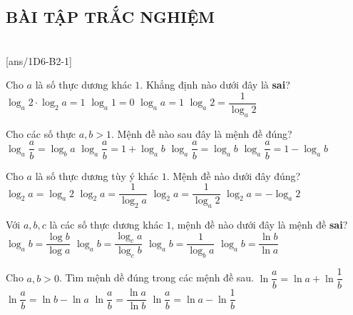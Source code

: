 \subsection{BÀI TẬP TRẮC NGHIỆM}

 \\
\setcounter{ex}{0}
[ans/1D6-B2-1]
\begin{ex}
	Cho $a$ là số thực dương khác $1$. Khẳng định nào dưới đây là \textbf{sai}?
	\choice
	{ $\log_a {2}\cdot \log_2 {a}=1$}
	{$\log_a {1}=0$}
	{$\log_a {a}=1$}
	{\True $\log_a {2}=\dfrac{1}{\log_a {2}}$}
	
	
\end{ex} 

\begin{ex}
	Cho các số thực $a, b>1$. Mệnh đề nào sau đây là mệnh đề đúng?
	\choice
	{$\log_a\dfrac{a}{b}=\log_b a$}
	{$\log_a\dfrac{a}{b}=1+\log_a b$}
	{$\log_a\dfrac{a}{b}=\log_a b$}
	{\True $\log_a\dfrac{a}{b}=1-\log_a b$}
\end{ex}

\begin{ex}
	Cho $a$ là số thực dương tùy ý khác $ 1 $. Mệnh đề nào dưới đây đúng?
	\choice
	{$\log_{2}a=\log_{a}2$}
	{$\log_{2}a=\dfrac{1}{\log_{2}a}$}
	{\True $\log_{2}a=\dfrac{1}{\log_{a}2}$}
	{$\log_{2}a=-\log_{a}2$}
\end{ex}

\begin{ex}
	Với $a,b,c$ là các số thực dương khác $1$, mệnh đề nào dưới đây là mệnh đề \textbf{sai}?
	\choice
	{$\log_ab=\dfrac{\log b}{\log a}$}
	{\True $\log_ab=\dfrac{\log_ca}{\log_cb}$}
	{$\log_ab=\dfrac{1}{\log_ba}$}
	{$\log_ab=\dfrac{\ln b}{\ln a}$}
\end{ex}

\begin{ex}
	Cho $a,b>0$. Tìm mệnh dề đúng trong các mệnh đề sau.
	\choice
	{\True $\ln \dfrac{a}{b}=\ln a+\ln \dfrac{1}{b}$}
	{$\ln \dfrac{a}{b}=\ln b-\ln a$}
	{$\ln \dfrac{a}{b}=\dfrac{\ln a}{\ln b}$}
	{$\ln \dfrac{a}{b}=\ln a-\ln \dfrac{1}{b}$}
\end{ex} 

